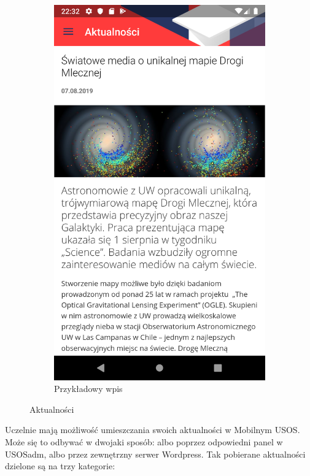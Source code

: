 \documentclass{pracamgr}
\begin{document}
\begin{figure}[p]
\begin{subfigure}[t]{0.3\textwidth}
		\includegraphics[width=\textwidth]{img/news_item.png}
		\caption{Przykładowy wpis}
		\label{fig:news_item}
	\end{subfigure}
	\caption{Aktualności}\label{fig:news}
	\medskip
\end{figure}

Uczelnie mają możliwość umieszczania swoich aktualności w Mobilnym USOS. Może się
to odbywać w dwojaki sposób: albo poprzez odpowiedni panel w USOSadm, albo przez
zewnętrzny serwer Wordpress. Tak pobierane aktualności dzielone są na trzy kategorie:
\end{document}
